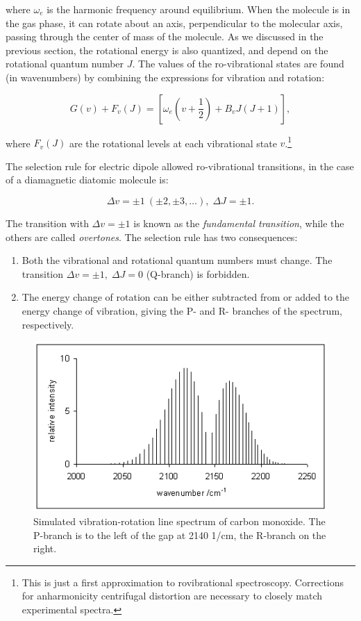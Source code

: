 \documentclass[
  9pt,
]{extbook}
\providecommand{\tightlist}{%
  \setlength{\itemsep}{0pt}\setlength{\parskip}{0pt}}
\theoremstyle{definition}
\theoremstyle{definition}
\theoremstyle{definition}
\theoremstyle{remark}
\begin{document}
where \(\omega_e\) is the harmonic frequency around equilibrium. When the molecule is in the gas phase, it can rotate about an axis, perpendicular to the molecular axis, passing through the center of mass of the molecule. As we discussed in the previous section, the rotational energy is also quantized, and depend on the rotational quantum number \(J\). The values of the ro-vibrational states are found (in wavenumbers) by combining the expressions for vibration and rotation:

\begin{equation}
G(v)+F_{v}(J)=\left[\omega_e \left(v + \frac{1}{2} \right) +B_{v}J(J+1)\right],
\label{eq:vib2}
\end{equation}

where \(F_{v}(J)\) are the rotational levels at each vibrational state \(v\).\footnote{This is just a first approximation to rovibrational spectroscopy. Corrections for anharmonicity centrifugal distortion are necessary to closely match experimental spectra.}

The selection rule for electric dipole allowed ro-vibrational transitions, in the case of a diamagnetic diatomic molecule is:

\begin{equation} 
\Delta v=\pm 1\ (\pm 2,\pm 3,\ldots),\; \Delta J=\pm 1.
\label{eq:vib3}
\end{equation}

The transition with \(\Delta v =\pm 1\) is known as the \emph{fundamental transition}, while the others are called \emph{overtones}. The selection rule has two consequences:

\begin{enumerate}
\def\labelenumi{\arabic{enumi}.}
\tightlist
\item
  Both the vibrational and rotational quantum numbers must change. The transition \(\Delta v=\pm 1,\;\Delta J=0\) (Q-branch) is forbidden.
\item
  The energy change of rotation can be either subtracted from or added to the energy change of vibration, giving the P- and R- branches of the spectrum, respectively.
\end{enumerate}

\begin{figure}

{\centering \includegraphics[width=0.5\linewidth]{./img/OEP_wiki6} 

}

\caption{Simulated vibration-rotation line spectrum of carbon monoxide. The P-branch is to the left of the gap at 2140 1/cm, the R-branch on the right.}\label{fig:Fig2c13}
\end{figure}
\end{document}
